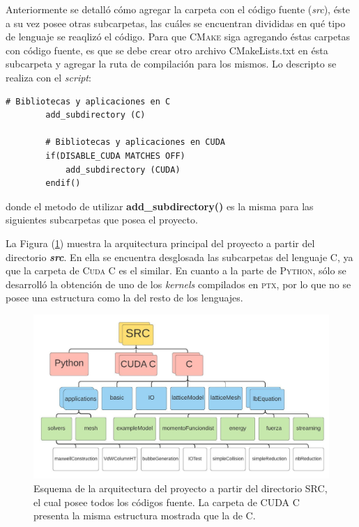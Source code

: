 Anteriormente se detalló cómo agregar la carpeta con el código fuente (\textit{src}), éste a su vez posee otras subcarpetas, las cuáles se encuentran divididas en qué tipo de lenguaje se reaqlizó el código. Para que \textsc{CMake} siga agregando éstas carpetas con código fuente, es que se debe crear otro archivo CMakeLists.txt en ésta subcarpeta y agregar la ruta de compilación para los mismos. Lo descripto se realiza con el \textit{script}:

{\footnotesize
	\begin{frame}{}
		\begin{lstlisting}[frame=single]
		# Bibliotecas y aplicaciones en C
		add_subdirectory (C)

		# Bibliotecas y aplicaciones en CUDA
		if(DISABLE_CUDA MATCHES OFF)
			add_subdirectory (CUDA)
		endif()
		\end{lstlisting}
		
	\end{frame}
}


donde el metodo de utilizar \textbf{add\_subdirectory()} es la misma para las siguientes subcarpetas que posea el proyecto. 

La Figura (\ref{fig:arq_proyecto}) muestra la arquitectura principal del proyecto a partir del directorio \textit{\textbf{src}}. En ella se encuentra desglosada las subcarpetas del lenguaje \textsc{C}, ya que la carpeta de \textsc{Cuda C} es el similar. En cuanto a la parte de \textsc{Python}, sólo se desarrolló la obtención de uno de los \textit{kernels} compilados en \textsc{ptx}, por lo que no se posee una estructura como la del resto de los lenguajes.

\begin{figure}[htbp]
	\centering
	\includegraphics[width=\textwidth]{figs/cap3/arquitectura_del_proyecto_LBCUDA_Test}
	\caption{Esquema de la arquitectura del proyecto a partir del directorio SRC, el cual posee todos los códigos fuente. La carpeta de CUDA C presenta la misma estructura mostrada que la de C.}
	\label{fig:arq_proyecto}	
\end{figure}


